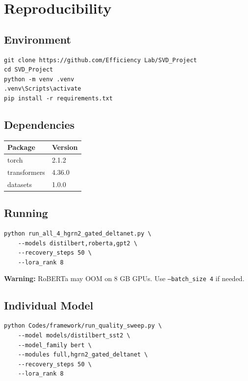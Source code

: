 \section{Reproducibility}

\subsection{Environment}

\begin{lstlisting}
git clone https://github.com/Efficiency Lab/SVD_Project
cd SVD_Project
python -m venv .venv
.venv\Scripts\activate
pip install -r requirements.txt
\end{lstlisting}

\subsection{Dependencies}

\begin{table}[H]
\centering
\small
\begin{tabular}{ll}
\toprule
\textbf{Package} & \textbf{Version} \\
\midrule
torch & 2.1.2 \\
transformers & 4.36.0 \\
datasets & 1.0.0 \\
\bottomrule
\end{tabular}
\end{table}

\subsection{Running}

\begin{lstlisting}
python run_all_4_hgrn2_gated_deltanet.py \
    --models distilbert,roberta,gpt2 \
    --recovery_steps 50 \
    --lora_rank 8
\end{lstlisting}

\textbf{Warning:} RoBERTa may OOM on 8 GB GPUs. Use \texttt{--batch\_size 4} if needed.

\subsection{Individual Model}

\begin{lstlisting}
python Codes/framework/run_quality_sweep.py \
    --model models/distilbert_sst2 \
    --model_family bert \
    --modules full,hgrn2_gated_deltanet \
    --recovery_steps 50 \
    --lora_rank 8
\end{lstlisting}

